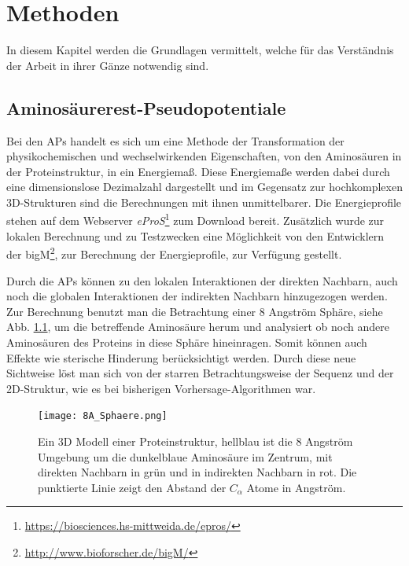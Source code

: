\chapter{Methoden}
\label{cha:Methoden}

In diesem Kapitel werden die Grundlagen vermittelt, welche für das Verständnis der Arbeit in ihrer Gänze notwendig sind.

\section{Aminosäurerest-Pseudopotentiale}

Bei den \acf{APs} handelt es sich um eine Methode der Transformation der physikochemischen und wechselwirkenden Eigenschaften, von den Aminosäuren in der Proteinstruktur, in ein Energiemaß. Diese Energiemaße werden dabei durch eine dimensionslose Dezimalzahl dargestellt und im Gegensatz zur hochkomplexen 3D-Strukturen sind die Berechnungen mit ihnen unmittelbarer. Die Energieprofile stehen auf dem Webserver \emph{eProS}\footnote{\url{https://biosciences.hs-mittweida.de/epros/}} zum Download bereit. Zusätzlich wurde zur lokalen Berechnung und zu Testzwecken eine Möglichkeit von den Entwicklern der \ac{bigM}\footnote{\url{http://www.bioforscher.de/bigM/}}, zur Berechnung der Energieprofile, zur Verfügung gestellt.

Durch die \ac{APs} können zu den lokalen Interaktionen der direkten Nachbarn, auch noch die globalen Interaktionen der indirekten Nachbarn hinzugezogen werden. Zur Berechnung benutzt man die Betrachtung einer 8 Angström Sphäre, siehe Abb. \ref{fig:8A_Sphaere}, um die betreffende Aminosäure herum und analysiert ob noch andere Aminosäuren des Proteins in diese Sphäre hineinragen. Somit können auch Effekte wie sterische Hinderung berücksichtigt werden. Durch diese neue Sichtweise löst man sich von der starren Betrachtungsweise der Sequenz und der 2D-Struktur, wie es bei bisherigen Vorhersage-Algorithmen war.

\begin{figure}
    \centering
    \texttt{[image: 8A\_Sphaere.png]}
    \caption{Ein 3D Modell einer Proteinstruktur, hellblau ist die 8 Angström Umgebung um die dunkelblaue Aminosäure im Zentrum, mit direkten Nachbarn in grün und in indirekten Nachbarn in rot. Die punktierte Linie zeigt den Abstand der $C_{\alpha}$ Atome in Angström.}%
    \label{fig:8A_Sphaere}
\end{figure}

